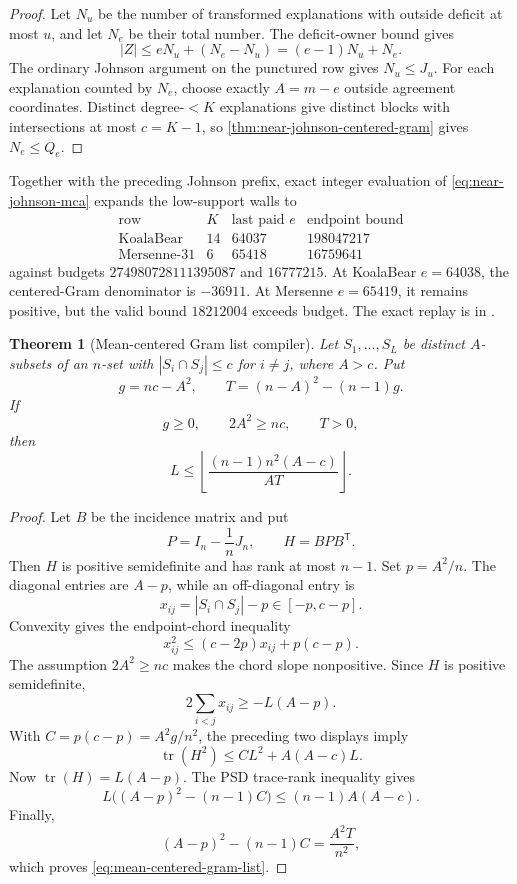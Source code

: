 \documentclass[11pt,a4paper]{amsart}
\numberwithin{equation}{section}
\newtheorem{theorem}{Theorem}[section]
\theoremstyle{remark}
\begin{document}
\begin{proof}
Let \(N_u\) be the number of transformed explanations with outside deficit
at most \(u\), and let \(N_e\) be their total number.  The deficit-owner
bound gives
\[
 |Z|\le eN_u+(N_e-N_u)=(e-1)N_u+N_e.
\]
The ordinary Johnson argument on the punctured row gives \(N_u\le J_u\).
For each explanation counted by \(N_e\), choose exactly \(A=m-e\) outside
agreement coordinates.  Distinct degree-\(<K\) explanations give distinct
blocks with intersections at most \(c=K-1\), so
\cref{thm:near-johnson-centered-gram} gives \(N_e\le Q_e\).
\end{proof}

\begin{remark}
Together with the preceding Johnson prefix, exact integer evaluation of
\eqref{eq:near-johnson-mca} expands the low-support walls to
\[
\begin{array}{c|c|c|c}
\text{row}&K&\text{last paid }e&\text{endpoint bound}\\ \hline
\text{KoalaBear}&14&64037&198047217\\
\text{Mersenne-31}&6&65418&16759641
\end{array}
\]
against budgets \(274980728111395087\) and \(16777215\).  At KoalaBear
\(e=64038\), the centered-Gram denominator is \(-36911\).  At Mersenne
\(e=65419\), it remains positive, but the valid bound \(18212004\) exceeds
budget.  The exact replay is in
.
\end{remark}

\begin{theorem}[Mean-centered Gram list compiler]
\label{thm:mean-centered-gram-list}
Let \(S_1,\ldots,S_L\) be distinct \(A\)-subsets of an \(n\)-set with
\(|S_i\cap S_j|\le c\) for \(i\ne j\), where \(A>c\).  Put
\[
 g=nc-A^2,
 \qquad
 T=(n-A)^2-(n-1)g.
\]
If
\[
 g\ge0,
 \qquad
 2A^2\ge nc,
 \qquad
 T>0,
\]
then
\begin{equation}
 L\le\left\lfloor
 \frac{(n-1)n^2(A-c)}{AT}
 \right\rfloor.
 \label{eq:mean-centered-gram-list}
\end{equation}
\end{theorem}

\begin{proof}
Let \(B\) be the incidence matrix and put
\[
 P=I_n-\frac1nJ_n,
 \qquad
 H=BPB^{\mathsf T}.
\]
Then \(H\) is positive semidefinite and has rank at most \(n-1\).  Set
\(p=A^2/n\).  The diagonal entries are \(A-p\), while an off-diagonal
entry is
\[
 x_{ij}=|S_i\cap S_j|-p\in[-p,c-p].
\]
Convexity gives the endpoint-chord inequality
\[
 x_{ij}^2\le(c-2p)x_{ij}+p(c-p).
\]
The assumption \(2A^2\ge nc\) makes the chord slope nonpositive.  Since
\(H\) is positive semidefinite,
\[
 2\sum_{i<j}x_{ij}\ge-L(A-p).
\]
With \(C=p(c-p)=A^2g/n^2\), the preceding two displays imply
\[
 \operatorname{tr}(H^2)\le CL^2+A(A-c)L.
\]
Now \(\operatorname{tr}(H)=L(A-p)\).  The PSD trace-rank inequality gives
\[
 L\bigl((A-p)^2-(n-1)C\bigr)\le(n-1)A(A-c).
\]
Finally,
\[
 (A-p)^2-(n-1)C=\frac{A^2T}{n^2},
\]
which proves \eqref{eq:mean-centered-gram-list}.
\end{proof}
\end{document}
